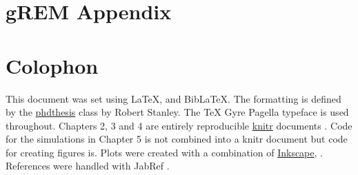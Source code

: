 
\appendix
\chapter{gREM Appendix}
\label{appendixlabel1}




\chapter{Colophon}
\label{appendixlabel3}

This document was set using \LaTeX, \XeLaTeX\vspace{1mm} and Bib\LaTeX.
The formatting is defined by the \href{https://github.com/robjstan/latex-phdthesis}{phdthesis} class by Robert Stanley.
The TeX Gyre Pagella typeface is used throughout.
Chapters 2, 3 and 4 are entirely reproducible \href{http://yihui.name/knitr/}{knitr} documents \cite{knitr}.
Code for the simulations in Chapter 5 is not combined into a knitr document but code for creating figures is.
Plots were created with a combination of \href{www.inkscape.org}{Inkscape}, \textcite{ggplot2, palettetown, ggtree}.
References were handled with JabRef \cite{JabRef_software}. 

